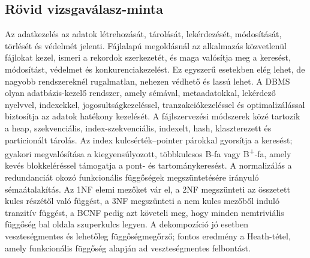 \subsection{Rövid vizsgaválasz-minta}

\begin{summarybox}
Az adatkezelés az adatok létrehozását, tárolását, lekérdezését, módosítását, törlését és védelmét jelenti. Fájlalapú megoldásnál az alkalmazás közvetlenül fájlokat kezel, ismeri a rekordok szerkezetét, és maga valósítja meg a keresést, módosítást, védelmet és konkurenciakezelést. Ez egyszerű esetekben elég lehet, de nagyobb rendszereknél rugalmatlan, nehezen védhető és lassú lehet. A DBMS olyan adatbázis-kezelő rendszer, amely sémával, metaadatokkal, lekérdező nyelvvel, indexekkel, jogosultságkezeléssel, tranzakciókezeléssel és optimalizálással biztosítja az adatok hatékony kezelését. A fájlszervezési módszerek közé tartozik a heap, szekvenciális, index-szekvenciális, indexelt, hash, klaszterezett és particionált tárolás. Az index kulcsérték--pointer párokkal gyorsítja a keresést; gyakori megvalósítása a kiegyensúlyozott, többkulcsos B-fa vagy B\textsuperscript{+}-fa, amely kevés blokkeléréssel támogatja a pont- és tartománykeresést. A normalizálás a redundanciát okozó funkcionális függőségek megszüntetésére irányuló sémaátalakítás. Az 1NF elemi mezőket vár el, a 2NF megszünteti az összetett kulcs részétől való függést, a 3NF megszünteti a nem kulcs mezőből induló tranzitív függést, a BCNF pedig azt követeli meg, hogy minden nemtriviális függőség bal oldala szuperkulcs legyen. A dekompozíció jó esetben veszteségmentes és lehetőleg függőségmegőrző; fontos eredmény a Heath-tétel, amely funkcionális függőség alapján ad veszteségmentes felbontást.
\end{summarybox}
